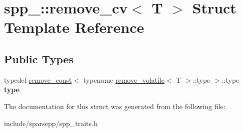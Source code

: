 \hypertarget{structspp___1_1remove__cv}{}\section{spp\+\_\+\+:\+:remove\+\_\+cv$<$ T $>$ Struct Template Reference}
\label{structspp___1_1remove__cv}
\subsection*{Public Types}
\begin{DoxyCompactItemize}
\item 
typedef \hyperlink{structspp___1_1remove__const}{remove\+\_\+const}$<$ typename \hyperlink{structspp___1_1remove__volatile}{remove\+\_\+volatile}$<$ T $>$\+::type $>$\+::type {\bfseries type}\hypertarget{structspp___1_1remove__cv_a42ea55f015459be17251e70291217dac}{}\label{structspp___1_1remove__cv_a42ea55f015459be17251e70291217dac}

\end{DoxyCompactItemize}


The documentation for this struct was generated from the following file\+:\begin{DoxyCompactItemize}
\item 
include/sparsepp/spp\+\_\+traits.\+h\end{DoxyCompactItemize}
